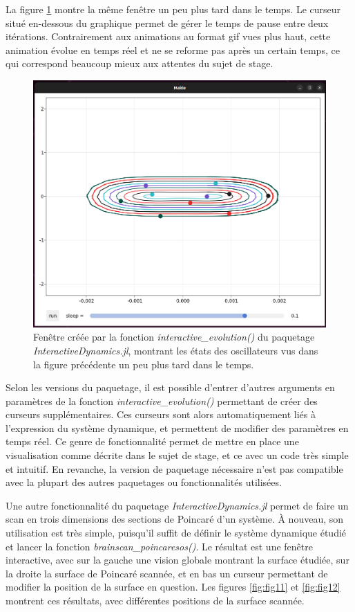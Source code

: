 \documentclass[a4paper, french, 12pt, titlepage]{article}
\begin{document}
La figure \ref{fig:fig10} montre la même fenêtre un peu plus tard dans le temps.
Le curseur situé en-dessous du graphique permet de gérer le temps de pause entre deux itérations. 
Contrairement aux animations au format gif vues plus haut, cette animation évolue en temps réel et ne se reforme pas après un certain temps, ce qui correspond beaucoup mieux aux attentes du sujet de stage.

\begin{figure}[H]
  \begin{center}
    \includegraphics[width=0.8\linewidth]{interactiveevolution_1.png}
    \caption{Fenêtre créée par la fonction \emph{interactive\_evolution()} du paquetage \emph{InteractiveDynamics.jl}, montrant les états des oscillateurs vus dans la figure précédente un peu plus tard dans le temps.}
    \label{fig:fig10}
  \end{center}
\end{figure}


Selon les versions du paquetage, il est possible d'entrer d'autres arguments en paramètres de la fonction \emph{interactive\_evolution()} permettant de créer des curseurs supplémentaires.
Ces curseurs sont alors automatiquement liés à l'expression du système dynamique, et permettent de modifier des paramètres en temps réel.
Ce genre de fonctionnalité permet de mettre en place une visualisation comme décrite dans le sujet de stage, et ce avec un code très simple et intuitif.
En revanche, la version de paquetage nécessaire n'est pas compatible avec la plupart des autres paquetages ou fonctionnalités utilisées. 

Une autre fonctionnalité du paquetage \emph{InteractiveDynamics.jl} permet de faire un scan en trois dimensions des sections de Poincaré d'un système.
À nouveau, son utilisation est très simple, puisqu'il suffit de définir le système dynamique étudié et lancer la fonction \emph{brainscan\_poincaresos()}.
Le résultat est une fenêtre interactive, avec sur la gauche une vision globale montrant la surface étudiée, sur la droite la surface de Poincaré scannée, et en bas un curseur permettant de modifier la position de la surface en question.
Les figures \ref{fig:fig11} et \ref{fig:fig12} montrent ces résultats, avec différentes positions de la surface scannée. \\
\end{document}
